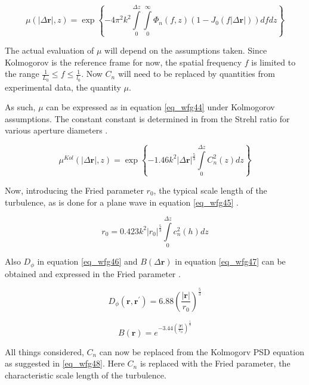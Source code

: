 \documentclass{article}
\begin{document}
\begin{equation}
\mu(|\Delta \textbf{r}|,z) = \exp \left\{ -4 \pi^2 k^2 \int \limits_0^{\Delta z} \int \limits_0^\infty \Phi_n(f,z)(1 - J_0(f |\Delta \textbf{r}|)) df dz \right\}
\label{eq_wfg43}
\end{equation}

The actual evaluation of $\mu$ will depend on the assumptions taken. Since Kolmogorov is the reference frame for now, the spatial frequency $f$ is limited to the range $ \frac{1}{L_0} \leq f \leq \frac{1}{l_0}$. Now $C_n$ will need to be replaced by quantities from experimental data, the quantity $\mu$.

As such, $\mu$ can be expressed as in equation \ref{eq_wfg44} under Kolmogorov assumptions. The constant constant is determined in from the Strehl ratio for various aperture diameters \cite{tubbs2003lucky}.

\begin{equation}
\mu^{Kol}(|\Delta \textbf{r}|,z) = \exp \left\{ -1.46 k^2 |\Delta \textbf{r}|^{\frac{5}{3}} \int \limits_0^{\Delta z} C_n^2(z) dz \right\}
\label{eq_wfg44}
\end{equation}

\newpage
Now, introducing the Fried parameter $r_0$, the typical scale length of the turbulence, as is done for a plane wave in equation \ref{eq_wfg45}\cite{lectureNotes} \cite{zernikeCircle}.

\begin{equation}
r_0 = 0.423 k^2 |r_0|^{\frac{5}{3}} \int \limits_{0}^{\Delta z} c_{n}^2(h) dz
\label{eq_wfg45}
\end{equation}

Also $D_\phi$ in equation \ref{eq_wfg46} and $B(\Delta \textbf{r})$ in equation \ref{eq_wfg47} can be obtained and expressed in the Fried parameter \cite{zernikeCircle}.

\begin{equation}
D_\phi(\textbf{r},\textbf{r}^{'}) = 6.88 \left(\frac{|\textbf{r}|}{r_0}\right)^{\frac{5}{3}}
\label{eq_wfg46}
\end{equation}

\begin{equation}
B(\textbf{r}) = e^{-3.44 \left(\frac{|\textbf{r}|}{r_0} \right)^{\frac{5}{3}}}
\label{eq_wfg47}
\end{equation}

All things considered, $C_n$ can now be replaced from the Kolmogorv PSD equation as suggested in \ref{eq_wfg48}. Here $C_n$ is replaced with the Fried parameter, the characteristic scale length of the turbulence.
\end{document}
